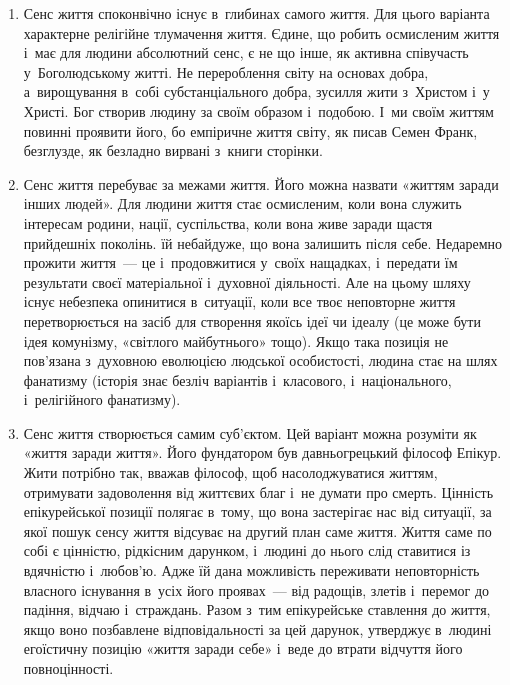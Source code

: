 \documentclass[a5paper,oneside,DIV=12,12pt,headings=small]{scrartcl}
\begin{document}
		\begin{enumerate}
			\item Сенс життя споконвічно існує в~глибинах самого життя. Для цього варіанта характерне релігійне тлумачення життя. Єдине, що робить осмисленим життя і~має для людини абсолютний сенс, є не що інше, як активна співучасть у~Боголюдському житті. Не перероблення світу на основах добра, а~вирощування в~собі субстанціального добра, зусилля жити з~Христом і~у Христі. Бог створив людину за своїм образом і~подобою. І~ми своїм життям повинні проявити його, бо емпіричне життя світу, як писав Семен Франк, безглузде, як безладно вирвані з~книги сторінки.
			\item Сенс життя перебуває за межами життя. Його можна назвати «життям заради інших людей». Для людини життя стає осмисленим, коли вона служить інтересам родини, нації, суспільства, коли вона живе заради щастя прийдешніх поколінь. їй небайдуже, що вона залишить після себе. Недаремно прожити життя~— це і~продовжитися у~своїх нащадках, і~передати їм результати своєї матеріальної і~духовної діяльності. Але на цьому шляху існує небезпека опинитися в~ситуації, коли все твоє неповторне життя перетворюється на засіб для створення якоїсь ідеї чи ідеалу (це може бути ідея комунізму, «світлого майбутнього» тощо). Якщо така позиція не пов'\-я\-за\-на з~духовною еволюцією людської особистості, людина стає на шлях фанатизму (історія знає безліч варіантів і~класового, і~національного, і~релігійного фанатизму).
			\item Сенс життя створюється самим суб'\-єктом. Цей варіант можна розуміти як «життя заради життя». Його фундатором був давньогрецький філософ Епікур. Жити потрібно так, вважав філософ, щоб насолоджуватися життям, отримувати задоволення від життєвих благ і~не думати про смерть. Цінність епікурейської позиції полягає в~тому, що вона застерігає нас від ситуації, за якої пошук сенсу життя відсуває на другий план саме життя. Життя саме по собі є цінністю, рідкісним дарунком, і~людині до нього слід ставитися із вдячністю і~любов'ю. Адже їй дана можливість переживати неповторність власного існування в~усіх його проявах~— від радощів, злетів і~перемог до падіння, відчаю і~страждань. Разом з~тим епікурейське ставлення до життя, якщо воно позбавлене відповідальності за цей дарунок, утверджує в~людині егоїстичну позицію «життя заради себе» і~веде до втрати відчуття його повноцінності.
		\end{enumerate}

\end{document}
